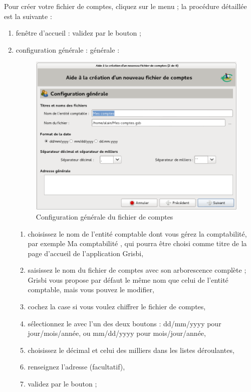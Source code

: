 Pour créer votre fichier de comptes, cliquez sur le menu  ; la procédure détaillée est la suivante :

\begin{enumerate}
	\item fenêtre d'accueil : validez par le bouton  ;
	\item configuration
		\ifIllustration générale :
		\else générale :
		\fi

		\ifIllustration
		\begin{figure}[htbp]
		\begin{center}
		\includegraphics[scale=0.5]{image/screenshot/start_file_create}
		\end{center}
		\caption{Configuration générale du fichier de comptes}
		\label{start-file-create-img}
		\end{figure}
		\fi
		
		\begin{enumerate} 
		 	\item choisissez le nom de l'entité comptable dont vous gérez la comptabilité, par exemple \og Ma comptabilité \fg{}, qui pourra être choisi comme titre de la page d'accueil de l'application Grisbi,
			\item saisissez le nom du fichier de comptes avec son arborescence complète ; Grisbi vous propose par défaut le même nom que celui de l'entité comptable, mais vous pouvez le modifier,
			\item cochez la case  si vous voulez \gls{chiffrer} le fichier de comptes,
			\item sélectionnez le  avec l'un des deux boutons : dd/mm/yyyy pour jour/mois/année, ou mm/dd/yyyy pour mois/jour/année,
			\item choisissez le  décimal et celui des milliers dans les listes déroulantes,
			 \item renseignez l'adresse (facultatif),
			 \item  validez par le bouton  ;
		\end{enumerate}
		

\end{enumerate}
